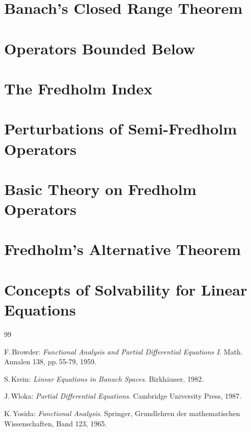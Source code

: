 \documentclass[11pt,twoside]{article}
\begin{document}
\section{Banach's Closed Range Theorem}
\section{Operators Bounded Below}
\section{The Fredholm Index}
\section{Perturbations of Semi-Fredholm Operators}
\section{Basic Theory on Fredholm Operators}
\section{Fredholm's Alternative Theorem}
\section{Concepts of Solvability for Linear Equations}

\vspace{5mm}
\begin{thebibliography}{99}
\begin{small}

 F.\,Browder:
\textit{Functional Analysis and Partial Differential Equations I}.
Math. Annalen 138, pp.\,55-79, 1959.

 S.\,Krein:
\textit{Linear Equations in Banach Spaces}.
Birk\-h\"{a}user, 1982.

 J.\,Wloka:
\textit{Partial Differential Equations}.
Cambridge University Press, 1987.

 K.\,Yosida:
\textit{Functional Analysis}.
Springer, Grund\-lehren der mathematischen Wissenschaften, Band 123, 1965.

\end{small}
\end{thebibliography}

\newpage
\thispagestyle{empty}
\end{document}
